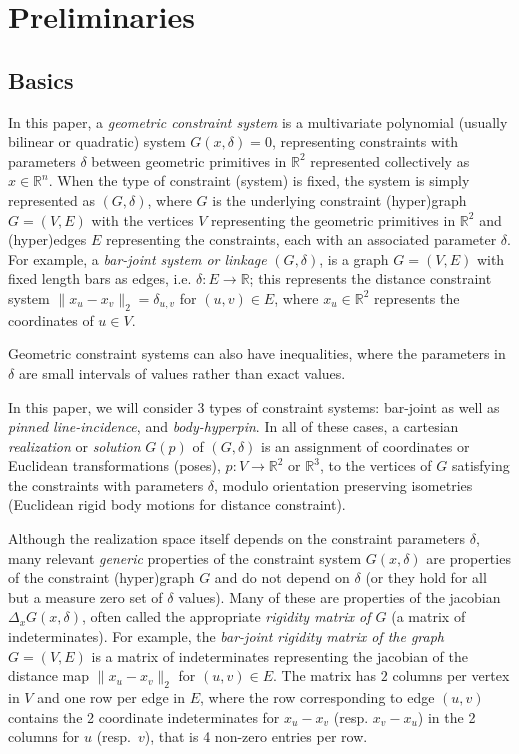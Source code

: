 \section{Preliminaries}
\label{sec:prelim}

\subsection{Basics}



In this paper, a {\em geometric constraint system} is a multivariate polynomial 
(usually bilinear or quadratic) system $G(x,\delta)=0$, representing constraints with parameters $\delta$ 
between geometric primitives  in $\mathbb{R}^2$ represented collectively as $x\in \mathbb{R}^n$.   
%
When the type of constraint (system) is fixed, the system is simply represented as $(G,\delta)$, where 
$G$ is the underlying constraint (hyper)graph $G = (V,E)$ 
with the vertices $V$ representing the geometric primitives in 
$\mathbb{R}^2$ and (hyper)edges
$E$ representing the constraints, each with an associated 
parameter $\delta$.
%
For example, a {\em bar-joint system or linkage} $(G,\delta)$, is a graph
$G=(V,E)$  
with fixed length bars as edges, i.e. $\delta: E \rightarrow \mathbb{R}$;
this represents the distance constraint system $\| x_u -x_v \|_2 =
\delta_{u,v}$ for  $(u,v) \in E$, where $x_u \in \mathbb{R}^2$ represents the coordinates of
$u\in V$. 

 Geometric constraint systems can also have inequalities, 
where the parameters in $\delta$ are small intervals of values rather than exact values.

In this paper, we will consider 3 types of constraint systems: bar-joint
as well as {\em pinned line-incidence}, and {\em body-hyperpin}. 
In all of these cases, a cartesian \emph{realization} or 
\emph{solution} $G(p)$ of $(G,\delta)$ is 
an assignment of coordinates or Euclidean transformations (poses), 
$p: V \rightarrow \mathbb{R}^2$ or $\mathbb{R}^3$, to the vertices of $G$ satisfying the 
constraints with parameters $\delta$, 
modulo orientation preserving isometries 
(Euclidean rigid body motions for distance constraint). 

Although the realization space itself depends on the constraint parameters 
$\delta$, many  relevant {\em generic} properties of 
the constraint system $G(x,\delta)$
are properties of the constraint (hyper)graph $G$ 
and do not depend on $\delta$ (or they hold for all but a measure 
zero set of $\delta$ values). Many of these are properties of the jacobian 
$\Delta_x G(x,\delta)$, often called the appropriate {\em rigidity matrix of $G$} 
(a matrix of indeterminates).
For example, the {\em bar-joint rigidity matrix 
of the graph $G = (V,E)$}
is a matrix of indeterminates representing the 
jacobian of the distance map 
$\| x_u -x_v \|_2$  for $(u,v) \in E$.
The matrix has $2$ columns per vertex in $V$ and one row per edge  in $E$, 
where the row corresponding to edge $(u,v)$ contains the 2 coordinate indeterminates 
for $x_u -x_v$ (resp. $x_v-x_u$) in the 2 columns for $u$ (resp.\ $v$), 
that is 4 non-zero entries per row. 


